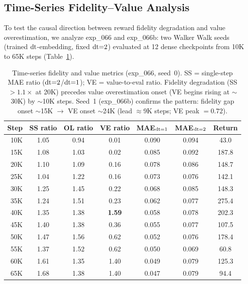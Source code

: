 \subsection{Time-Series Fidelity--Value Analysis}
\label{sec:timeseries_fidelity}

To test the causal direction between reward fidelity degradation and value overestimation, we analyze exp\_066 and exp\_066b: two Walker Walk seeds (trained $\mathrm{dt}$-embedding, fixed $\mathrm{dt}{=}2$) evaluated at 12 dense checkpoints from 10K to 65K steps (Table~\ref{tab:timeseries_fidelity}).

\begin{table}[h]
\centering
\caption{Time-series fidelity and value metrics (exp\_066, seed~0). SS = single-step MAE ratio ($\mathrm{dt}{=}2$/$\mathrm{dt}{=}1$); VE = value-to-eval ratio. Fidelity degradation (SS $>1.1\times$ at 20K) precedes value overestimation onset (VE begins rising at ${\sim}$30K) by ${\sim}$10K steps. Seed~1 (exp\_066b) confirms the pattern: fidelity gap onset ${\sim}$15K $\to$ VE onset ${\sim}$24K (lead ${\approx}$9K steps; VE peak ${=}0.72$).}
\label{tab:timeseries_fidelity}
\footnotesize
\setlength{\tabcolsep}{4pt}
\begin{tabular}{rcccccc}
\toprule
\textbf{Step} & \textbf{SS ratio} & \textbf{OL ratio} & \textbf{VE ratio} & \textbf{MAE$_{\mathrm{dt}{=}1}$} & \textbf{MAE$_{\mathrm{dt}{=}2}$} & \textbf{Return} \\
\midrule
10K & 1.05 & 0.94 & 0.01 & 0.090 & 0.094 & 43.0 \\
15K & 1.08 & 1.03 & 0.02 & 0.085 & 0.092 & 187.8 \\
20K & 1.10 & 1.09 & 0.16 & 0.078 & 0.086 & 148.7 \\
25K & 1.04 & 1.22 & 0.16 & 0.073 & 0.076 & 142.1 \\
30K & 1.25 & 1.45 & 0.22 & 0.068 & 0.085 & 148.3 \\
35K & 1.24 & 1.51 & 0.23 & 0.062 & 0.077 & 275.4 \\
40K & 1.35 & 1.38 & \textbf{1.59} & 0.058 & 0.078 & 202.3 \\
45K & 1.40 & 1.38 & 0.36 & 0.055 & 0.077 & 107.5 \\
50K & 1.47 & 1.56 & 0.62 & 0.052 & 0.076 & 178.4 \\
55K & 1.37 & 1.52 & 0.62 & 0.050 & 0.069 & 60.8 \\
60K & 1.61 & 1.35 & 1.40 & 0.049 & 0.079 & 125.3 \\
65K & 1.68 & 1.38 & 1.40 & 0.047 & 0.079 & 94.4 \\
\bottomrule
\end{tabular}
\end{table}

